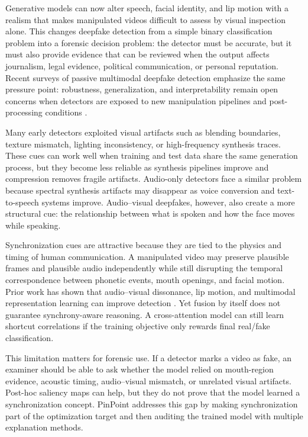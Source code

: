 \documentclass[preprint,12pt,number]{elsarticle}
\begin{document}
Generative models can now alter speech, facial identity, and lip motion with a realism that makes manipulated videos difficult to assess by visual inspection alone. This changes deepfake detection from a simple binary classification problem into a forensic decision problem: the detector must be accurate, but it must also provide evidence that can be reviewed when the output affects journalism, legal evidence, political communication, or personal reputation. Recent surveys of passive multimodal deepfake detection emphasize the same pressure point: robustness, generalization, and interpretability remain open concerns when detectors are exposed to new manipulation pipelines and post-processing conditions \cite{nguyen2024survey}.

Many early detectors exploited visual artifacts such as blending boundaries, texture mismatch, lighting inconsistency, or high-frequency synthesis traces. These cues can work well when training and test data share the same generation process, but they become less reliable as synthesis pipelines improve and compression removes fragile artifacts. Audio-only detectors face a similar problem because spectral synthesis artifacts may disappear as voice conversion and text-to-speech systems improve. Audio--visual deepfakes, however, also create a more structural cue: the relationship between what is spoken and how the face moves while speaking.

Synchronization cues are attractive because they are tied to the physics and timing of human communication. A manipulated video may preserve plausible frames and plausible audio independently while still disrupting the temporal correspondence between phonetic events, mouth openings, and facial motion. Prior work has shown that audio--visual dissonance, lip motion, and multimodal representation learning can improve detection \cite{chugh2020notmade,haliassos2021lips,raza2023multimodaltrace,javed2025avsff}. Yet fusion by itself does not guarantee synchrony-aware reasoning. A cross-attention model can still learn shortcut correlations if the training objective only rewards final real/fake classification.

This limitation matters for forensic use. If a detector marks a video as fake, an examiner should be able to ask whether the model relied on mouth-region evidence, acoustic timing, audio--visual mismatch, or unrelated visual artifacts. Post-hoc saliency maps can help, but they do not prove that the model learned a synchronization concept. PinPoint addresses this gap by making synchronization part of the optimization target and then auditing the trained model with multiple explanation methods.
\end{document}
